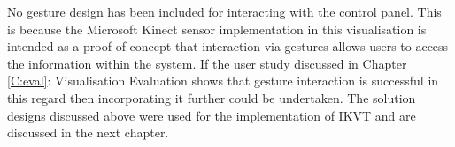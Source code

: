 \begin{enumerate}
No gesture design has been included for interacting with the control panel.
This is because the Microsoft Kinect sensor implementation in this visualisation
is intended as a proof of concept that interaction via gestures allows users
to access the information within the system. If the user study discussed in
Chapter \ref{C:eval}: Visualisation Evaluation shows that gesture interaction is
successful in this regard then incorporating it further could be undertaken.
 The solution designs discussed above were used for the
implementation of IKVT and are discussed in the next chapter.

\end{enumerate}